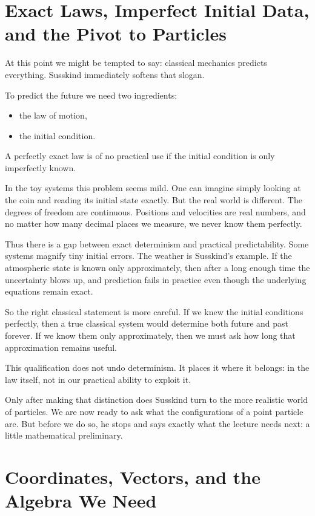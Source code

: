 \section{Exact Laws, Imperfect Initial Data, and the Pivot to Particles}

At this point we might be tempted to say: classical mechanics predicts everything. Susskind immediately softens that slogan.

To predict the future we need two ingredients:
\begin{itemize}
\item the law of motion,
\item the initial condition.
\end{itemize}
A perfectly exact law is of no practical use if the initial condition is only imperfectly known.

In the toy systems this problem seems mild. One can imagine simply looking at the coin and reading its initial state exactly. But the real world is different. The degrees of freedom are continuous. Positions and velocities are real numbers, and no matter how many decimal places we measure, we never know them perfectly.

Thus there is a gap between exact determinism and practical predictability. Some systems magnify tiny initial errors. The weather is Susskind's example. If the atmospheric state is known only approximately, then after a long enough time the uncertainty blows up, and prediction fails in practice even though the underlying equations remain exact.

So the right classical statement is more careful. If we knew the initial conditions perfectly, then a true classical system would determine both future and past forever. If we know them only approximately, then we must ask how long that approximation remains useful.

This qualification does not undo determinism. It places it where it belongs: in the law itself, not in our practical ability to exploit it.

Only after making that distinction does Susskind turn to the more realistic world of particles. We are now ready to ask what the configurations of a point particle are. But before we do so, he stops and says exactly what the lecture needs next: a little mathematical preliminary.

\section{Coordinates, Vectors, and the Algebra We Need}

